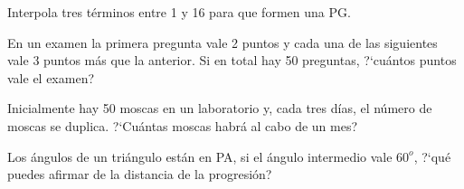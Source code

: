 
\begin{mipropuesto}

Interpola tres términos entre 1 y 16 para que formen una PG.
\end{mipropuesto}

\vspace{-8mm}
\begin{flushright}
\begin{footnotesize} \textcolor{gris}{}	\end{footnotesize}
\end{flushright}




\begin{mipropuesto}

En un examen la primera pregunta vale 2 puntos y cada una de las siguientes vale 3 puntos más que la anterior. Si en total hay 50 preguntas, ?`cuántos puntos vale el examen?
\end{mipropuesto}

\vspace{-8mm}
\begin{flushright}
\begin{footnotesize} \textcolor{gris}{}	\end{footnotesize}
\end{flushright}




\begin{mipropuesto}

Inicialmente hay 50 moscas en un laboratorio y, cada tres días, el número de moscas se duplica. ?`Cuántas moscas habrá al cabo de un mes?
\end{mipropuesto}

\vspace{-8mm}
\begin{flushright}
\begin{footnotesize} \textcolor{gris}{}	\end{footnotesize}
\end{flushright}




\begin{mipropuesto}

Los ángulos de un triángulo están en PA, si el ángulo intermedio vale $60^o$, ?`qué puedes afirmar de la distancia de la progresión?
\end{mipropuesto}


